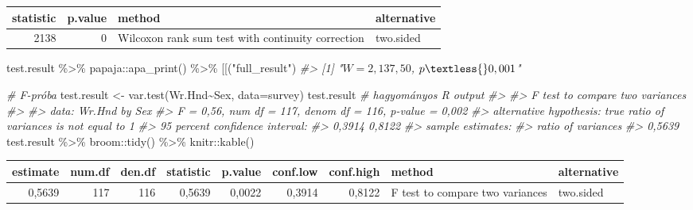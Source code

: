 \documentclass[
]{book}
\newenvironment{Shaded}{\begin{snugshade}}{\end{snugshade}}
\newcommand{\AttributeTok}[1]{\textcolor[rgb]{0.77,0.63,0.00}{#1}}
\newcommand{\CommentTok}[1]{\textcolor[rgb]{0.56,0.35,0.01}{\textit{#1}}}
\newcommand{\FunctionTok}[1]{\textcolor[rgb]{0.00,0.00,0.00}{#1}}
\newcommand{\NormalTok}[1]{#1}
\newcommand{\OtherTok}[1]{\textcolor[rgb]{0.56,0.35,0.01}{#1}}
\newcommand{\SpecialCharTok}[1]{\textcolor[rgb]{0.00,0.00,0.00}{#1}}
\newcommand{\StringTok}[1]{\textcolor[rgb]{0.31,0.60,0.02}{#1}}
\begin{document}
\begin{tabular}{r|r|l|l}
\hline
statistic & p.value & method & alternative\\
\hline
2138 & 0 & Wilcoxon rank sum test with continuity correction & two.sided\\
\hline
\end{tabular}

\begin{Shaded}
\begin{Highlighting}[]
\NormalTok{test.result }\SpecialCharTok{\%\textgreater{}\%}\NormalTok{ papaja}\SpecialCharTok{::}\FunctionTok{apa\_print}\NormalTok{() }\SpecialCharTok{\%\textgreater{}\%} \StringTok{\textasciigrave{}}\AttributeTok{[[}\StringTok{\textasciigrave{}}\NormalTok{(}\StringTok{"full\_result"}\NormalTok{)}
\CommentTok{\#\textgreater{} [1] "$W = 2,137,50$, $p \textless{} 0,001$"}


\CommentTok{\# F{-}próba}
\NormalTok{test.result }\OtherTok{\textless{}{-}} \FunctionTok{var.test}\NormalTok{(Wr.Hnd}\SpecialCharTok{\textasciitilde{}}\NormalTok{Sex, }\AttributeTok{data=}\NormalTok{survey)}
\NormalTok{test.result   }\CommentTok{\# hagyományos R output}
\CommentTok{\#\textgreater{} }
\CommentTok{\#\textgreater{}  F test to compare two variances}
\CommentTok{\#\textgreater{} }
\CommentTok{\#\textgreater{} data:  Wr.Hnd by Sex}
\CommentTok{\#\textgreater{} F = 0,56, num df = 117, denom df = 116, p{-}value = 0,002}
\CommentTok{\#\textgreater{} alternative hypothesis: true ratio of variances is not equal to 1}
\CommentTok{\#\textgreater{} 95 percent confidence interval:}
\CommentTok{\#\textgreater{}  0,3914 0,8122}
\CommentTok{\#\textgreater{} sample estimates:}
\CommentTok{\#\textgreater{} ratio of variances }
\CommentTok{\#\textgreater{}             0,5639}
\NormalTok{test.result }\SpecialCharTok{\%\textgreater{}\%}\NormalTok{ broom}\SpecialCharTok{::}\FunctionTok{tidy}\NormalTok{() }\SpecialCharTok{\%\textgreater{}\%}\NormalTok{ knitr}\SpecialCharTok{::}\FunctionTok{kable}\NormalTok{()}
\end{Highlighting}
\end{Shaded}

\begin{tabular}{r|r|r|r|r|r|r|l|l}
\hline
estimate & num.df & den.df & statistic & p.value & conf.low & conf.high & method & alternative\\
\hline
0,5639 & 117 & 116 & 0,5639 & 0,0022 & 0,3914 & 0,8122 & F test to compare two variances & two.sided\\
\hline
\end{tabular}
\end{document}

